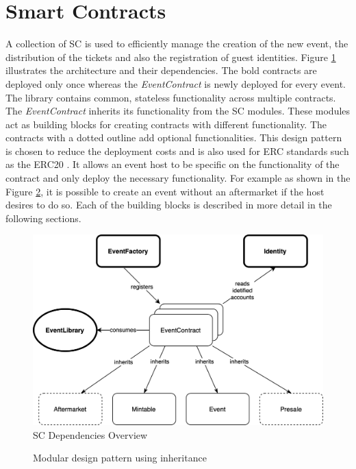 \section{Smart Contracts}

A collection of SC is used to efficiently manage the creation of the new event, the distribution of the tickets and also the registration of guest identities. Figure \ref{fig:smart-contract-overview} illustrates the architecture and their dependencies. The bold contracts are deployed only once whereas the \textit{EventContract} is newly deployed for every event. The library contains common, stateless functionality across multiple contracts. The \textit{EventContract} inherits its functionality from the SC modules. These modules act as building blocks for creating contracts with different functionality. The contracts with a dotted outline add optional functionalities. This design pattern is chosen to reduce the deployment costs and is also used for ERC standards such as the ERC20 \cite{solidity-inheritance}. It allows an event host to be specific on the functionality of the contract and only deploy the necessary functionality. For example as shown in the Figure \ref{code:smart-contract-inheritance}, it is possible to create an event without an aftermarket if the host desires to do so. Each of the building blocks is described in more detail in the following sections.

\begin{figure}[H]
    \centering
    \includegraphics[width=14cm]{figures/smart-contract-overview-4.png}
    \caption{SC Dependencies Overview}
    \label{fig:smart-contract-overview}
\end{figure}

\begin{figure}[H]
    
    \caption{Modular design pattern using inheritance}
    \label{code:smart-contract-inheritance}
\end{figure}


